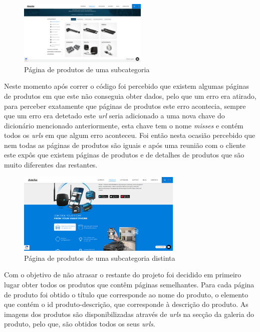 \begin{figure}[htb]
    \centering
    
    \includegraphics[width=0.55\textwidth]{images/implementacao/scraper/pagina_produtos_subcat.png}
    \caption{Página de produtos de uma subcategoria}
    \label{fig:51}
\end{figure}

\newpage
Neste momento após correr o código foi percebido que existem algumas páginas de produtos em que este não conseguia obter dados, pelo que um erro era atirado, para perceber exatamente que páginas de produtos este erro acontecia, sempre que um erro era detetado este \textit{url} seria adicionado a uma nova chave do dicionário mencionado anteriormente, esta chave tem o nome \textit{misses} e contém todos os \textit{urls} em que algum erro aconteceu. Foi então nesta ocasião percebido que nem todas as páginas de produtos são iguais e após uma reunião com o cliente este expôs que existem páginas de produtos e de detalhes de produtos que são muito diferentes das restantes.

\begin{figure}[htb]
    \centering
    
    \includegraphics[width=0.7\textwidth]{images/implementacao/scraper/mconnect.png}
    \caption{Página de produtos de uma subcategoria distinta}
    \label{fig:52}
\end{figure}

Com o objetivo de não atrasar o restante do projeto foi decidido em primeiro lugar obter todos os produtos que contêm páginas semelhantes. Para cada página de produto foi obtido o título que corresponde ao nome do produto, o elemento que contém o id produto-descrição, que corresponde à descrição do produto. As imagens dos produtos são disponibilizadas através de \textit{urls} na secção da galeria do produto, pelo que, são obtidos todos os seus \textit{urls}.

